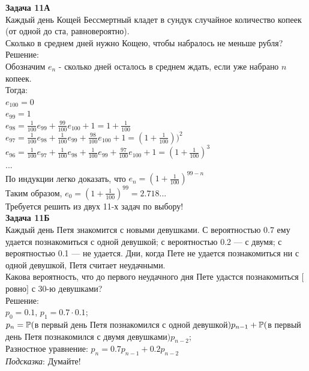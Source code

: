\documentclass[12pt, a4paper]{article}\usepackage[]{graphicx}\usepackage[]{color}
\begin{document}
	\textbf{Задача 11А} \\
	Каждый день Кощей Бессмертный кладет в сундук случайное количество
	копеек (от одной до ста, равновероятно). \\
	Сколько в среднем дней нужно Кощею, чтобы набралось не меньше рубля? \\
	Решение: \\
	Обозначим $e_{n}$ - сколько дней осталось в среднем ждать, если
	уже набрано $n$ копеек. \\
	Тогда: \\
	$e_{100}=0$ \\
	$e_{99}=1$ \\
	$e_{98}=\frac{1}{100}e_{99}+\frac{99}{100}e_{100}+1=1+\frac{1}{100}$\\
	$e_{97}=\frac{1}{100}e_{98}+\frac{1}{100}e_{99}+\frac{98}{100}e_{100}+1=(1+\frac{1}{100}))^{2}$
	\\
	$e_{96}=\frac{1}{100}e_{97}+\frac{1}{100}e_{98}+\frac{1}{100}e_{99}+\frac{97}{100}e_{100}+1=(1+\frac{1}{100})^{3}$
	\\
	... \\
	По индукции легко доказать, что $e_{n}=(1+\frac{1}{100})^{99-n}$ \\
	Таким образом, $e_{0}=(1+\frac{1}{100})^{99}=2.718...$ \\

	Требуется решить \textbf{} из двух 11-х задач по
	выбору! \\



	\textbf{Задача 11Б} \\
	Каждый день Петя знакомится с новыми девушками. С вероятностью 0.7
	ему удается познакомиться с одной девушкой; с вероятностью 0.2 — с
	двумя; с вероятностью 0.1 — не удается. Дни, когда Пете не удается
	познакомиться ни с одной девушкой, Петя считает неудачными. \\
	Какова вероятность, что до первого неудачного дня Пете удастся
	познакомиться $[$ровно$]$ с 30-ю девушками? \\
	Решение: \\
	$p_{0}=0.1$, $p_{1}=0.7\cdot 0.1$; \\
	$p_{n}=\P($в первый день Петя познакомился с одной
	девушкой$)p_{n-1}+\P($в первый день Петя познакомился с двумя
	девушками$)p_{n-2}$; \\
	Разностное уравнение: $p_{n}=0.7p_{n-1}+0.2p_{n-2}$ \\


	\emph{Подсказка}: Думайте! \\
\end{document}
